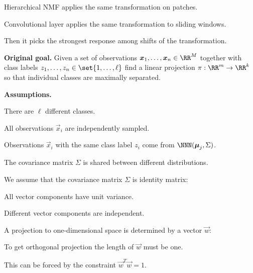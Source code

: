 \documentclass[landscape,footrule]{foils}
\begin{document}
\begin{triangles}
\item Hierarchical NMF applies the same transformation on patches.
\item Convolutional layer applies the same transformation to sliding windows.
\item Then it picks the strongest response among shifts of the transformation.
\end{triangles}





\textbf{Original goal.}
Given a set of observations $\vec{x}_1,\ldots,\vec{x}_n\in\RR^M$ together with class labels $z_1,\ldots,z_n\in\set{1,\ldots,\ell}$ find a linear projection $\pi:\RR^m\to\RR^k$ so that individual classes are maximally separated.\vspace*{1cm}

\textbf{Assumptions.}
\begin{triangles}
\item There are $\ell$ different classes. 
\item All observations $\vec{x}_i$ are independently sampled.
\item Observations $\vec{x}_i$ with the same class label $z_i$ come from $\NNN(\vec{\mu}_j, \Sigma)$.
\item The covariance matrix $\Sigma$ is shared between different distributions.
\end{triangles}



We assume that the covariance matrix $\Sigma$ is identity matrix: 
\begin{triangles}
\item All vector components have unit variance. 
\item Different vector components are independent.
\end{triangles}



A projection to one-dimensional space is determined by a vector $\vec{w}$:
\begin{triangles}
\item To get orthogonal projection the length of $\vec{w}$ must be one.
\item This can be forced by the constraint $\vec{w}^T\vec{w}=1$.  
\end{triangles}
\end{document}
